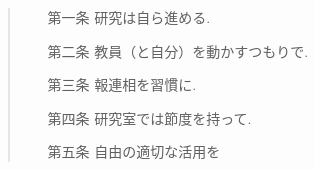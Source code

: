 \documentclass{jarticle}
\begin{document}
\begin{quote}
    \begin{itemize}
        \item[第一条] 研究は自ら進める.\\
        \item[第二条] 教員（と自分）を動かすつもりで.\\
        \item[第三条] 報連相を習慣に.\\
        \item[第四条] 研究室では節度を持って.\\
        \item[第五条] 自由の適切な活用を\\
    \end{itemize}
\end{quote}
\end{document}
